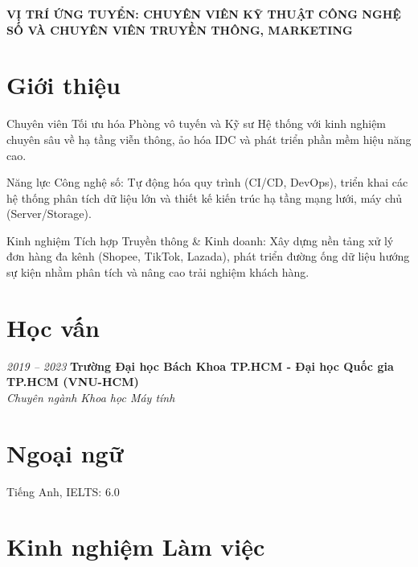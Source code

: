 \begin{center}
    \textbf{\large VỊ TRÍ ỨNG TUYỂN: CHUYÊN VIÊN KỸ THUẬT CÔNG NGHỆ SỐ VÀ CHUYÊN VIÊN TRUYỀN THÔNG, MARKETING}
\end{center}
\vspace{0.2cm}

\section{Giới thiệu}
\begin{onecolentry}
    \begin{highlights}
        \item Chuyên viên Tối ưu hóa Phòng vô tuyến và Kỹ sư Hệ thống với kinh nghiệm chuyên sâu về hạ tầng viễn thông, ảo hóa IDC và phát triển phần mềm hiệu năng cao.
        \item Năng lực Công nghệ số: Tự động hóa quy trình (CI/CD, DevOps), triển khai các hệ thống phân tích dữ liệu lớn và thiết kế kiến trúc hạ tầng mạng lưới, máy chủ (Server/Storage).
        \item Kinh nghiệm Tích hợp Truyền thông \& Kinh doanh: Xây dựng nền tảng xử lý đơn hàng đa kênh (Shopee, TikTok, Lazada), phát triển đường ống dữ liệu hướng sự kiện nhằm phân tích và nâng cao trải nghiệm khách hàng.
    \end{highlights}
\end{onecolentry}

\section{Học vấn}
\begin{twocolentry}{\textit{2019 -- 2023}}
    \textbf{Trường Đại học Bách Khoa TP.HCM - Đại học Quốc gia TP.HCM (VNU-HCM)}\\[4pt]
    \textit{Chuyên ngành Khoa học Máy tính}
\end{twocolentry}

\section{Ngoại ngữ}
\begin{onecolentry}
    \begin{highlights}
        \item Tiếng Anh, IELTS: 6.0
    \end{highlights}
\end{onecolentry}

\section{Kinh nghiệm Làm việc}

